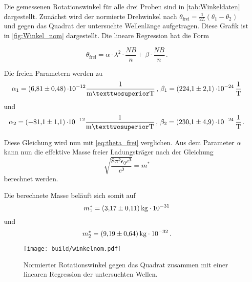Die gemessenen Rotationswinkel für alle drei Proben sind in \autoref{tab:Winkeldaten} dargestellt.
Zunächst wird der normierte Drehwinkel nach  $\theta_{\text{frei}} = \frac{1}{2 L}\left(\theta_1 - \theta_2\right)$ 
und gegen das Quadrat der untersuchte Wellenlänge aufgetragen.
Diese Grafik ist in \autoref{fig:Winkel_nom} dargestellt. 
Die lineare Regression hat die Form

\begin{equation*}
    \theta_{\text{frei}} = \alpha \cdot \lambda^2 \cdot \frac{N B}{n} + \beta \cdot \frac{N B}{n}\, .
\end{equation*}

Die freien Parametern werden zu %
\begin{equation*}
    \alpha_1 = \SI{6.81 \pm 0.48}\cdot 10^{-12} \unit{\frac{1}{\meter²\tesla}} \,, \, \beta_1 = \SI{224.1 \pm 2.1}\cdot 10^{-24} \, \unit{\frac{1}{\tesla}} \\ 
\end{equation*}
und
\begin{equation*}
    \alpha_2 = \SI{-81.1 \pm 1.1}\cdot 10^{-12} \unit{\frac{1}{\meter²\tesla}} \,, \,  \beta_2 = \SI{230.1  \pm 4.9}\cdot 10^{-24} \, \unit{\frac{1}{\tesla}}\, .  \\
\end{equation*}

Diese Gleichung wird nun mit \eqref{eq:theta_frei} verglichen.
Aus dem Parameter $\alpha$ kann nun die effektive Masse freier Ladungsträger nach der Gleichung
\begin{equation*}
    \sqrt{\frac{8 \pi² \epsilon_0 c³}{e³}} = m^*
\end{equation*} 
berechnet werden.

Die berechnete Masse beläuft sich somit auf 
\begin{equation*}
    m^*_1 = \SI{3.17 \pm 0.11}{\kilo\gram} \cdot 10^{-31} \, \\
\end{equation*}
und
\begin{equation*}
    m^*_2 = \SI{9.19 \pm 00.64}{\kilo\gram} \cdot 10^{-32} \,.   \\
\end{equation*}

\begin{figure}[H]
    \centering
    \texttt{[image: build/winkelnom.pdf]}
    \caption{Normierter Rotationswinkel gegen das Quadrat zusammen mit einer linearen Regression der untersuchten Wellen.}
    \label{fig:Winkel_nom}
\end{figure}


